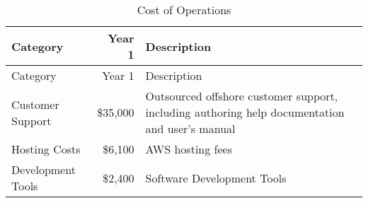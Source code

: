 \documentclass[10pt,openany]{book}
\begin{document}
\begin{longtable}[]{@{}lrl@{}}
\caption{Cost of Operations}\tabularnewline
\toprule
\begin{minipage}[b]{0.31\columnwidth}\raggedright
Category\strut
\end{minipage} & \begin{minipage}[b]{0.12\columnwidth}\raggedleft
Year 1\strut
\end{minipage} & \begin{minipage}[b]{0.48\columnwidth}\raggedright
Description\strut
\end{minipage}\tabularnewline
\midrule
\endfirsthead
\toprule
\begin{minipage}[b]{0.31\columnwidth}\raggedright
Category\strut
\end{minipage} & \begin{minipage}[b]{0.12\columnwidth}\raggedleft
Year 1\strut
\end{minipage} & \begin{minipage}[b]{0.48\columnwidth}\raggedright
Description\strut
\end{minipage}\tabularnewline
\midrule
\endhead
\begin{minipage}[t]{0.31\columnwidth}\raggedright
Customer Support\strut
\end{minipage} & \begin{minipage}[t]{0.12\columnwidth}\raggedleft
\$35,000\strut
\end{minipage} & \begin{minipage}[t]{0.48\columnwidth}\raggedright
Outsourced offshore customer support, including authoring help
documentation and user's manual\strut
\end{minipage}\tabularnewline
\begin{minipage}[t]{0.31\columnwidth}\raggedright
Hosting Costs\strut
\end{minipage} & \begin{minipage}[t]{0.12\columnwidth}\raggedleft
\$6,100\strut
\end{minipage} & \begin{minipage}[t]{0.48\columnwidth}\raggedright
AWS hosting fees\strut
\end{minipage}\tabularnewline
\begin{minipage}[t]{0.31\columnwidth}\raggedright
Development Tools\strut
\end{minipage} & \begin{minipage}[t]{0.12\columnwidth}\raggedleft
\$2,400\strut
\end{minipage} & \begin{minipage}[t]{0.48\columnwidth}\raggedright
Software Development Tools\strut
\end{minipage}\tabularnewline
\bottomrule
\end{longtable}
\end{document}

